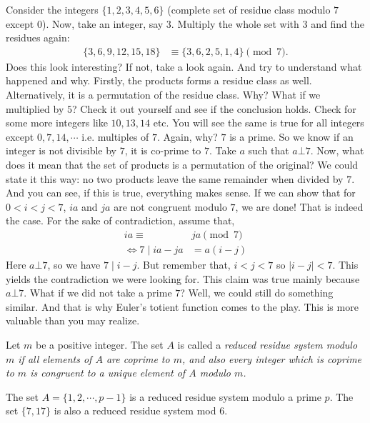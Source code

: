 \documentclass{subfile}
\begin{document}
	Consider the integers $\{1,2,3,4,5,6\}$ (complete set of residue class modulo $7$ except $0$). Now, take an integer, say $3$. Multiply the whole set with $3$ and find the residues again:
		\begin{align*}
			\{3,6,9,12,15,18\} & \equiv\{3,6,2,5,1,4\}\pmod7.
		\end{align*}
	Does this look interesting? If not, take a look again. And try to understand what happened and why. Firstly, the products forms a residue class as well. Alternatively, it is a permutation of the residue class. Why? What if we multiplied by $5$? Check it out yourself and see if the conclusion holds. Check for some more integers like $10, 13,14$ etc. You will see the same is true for all integers except $0,7,14,\cdots$ i.e. multiples of $7$. Again, why? $7$ is a prime. So we know if an integer is not divisible by $7$, it is co-prime to $7$. Take $a$ such that $a\bot7$. Now, what does it mean that the set of products is a permutation of the original? We could state it this way: no two products leave the same remainder when divided by $7$. And you can see, if this is true, everything makes sense. If we can show that for $0<i<j<7$, $ia$ and $ja$ are not congruent modulo $7$, we are done! That is indeed the case. For the sake of contradiction, assume that,
		\begin{align*}
			ia  \equiv &ja\pmod7\\
			\iff 7\mid ia-ja&=a(i-j)
		\end{align*}
	Here $a\bot7$, so we have $7\mid i-j$. But remember that, $i<j<7$ so $|i-j|<7$. This yields the contradiction we were looking for. This claim was true mainly because $a\bot7$. What if we did not take a prime $7$? Well, we could still do something similar. And that is why Euler's totient function comes to the play. This is more valuable than you may realize.
	
	\begin{definition}
		Let $m$ be a positive integer. The set $A$ is called a \slshape{reduced residue system modulo $m$} if all elements of $A$ are coprime to $m$, and also every integer which is coprime to $m$ is congruent to a unique element of $A$ modulo $m$.
	\end{definition}
	
	\begin{example}
		The set $A=\{ 1, 2, \cdots, p-1 \}$ is a reduced residue system modulo a prime $p$. The set $\{7, 17\}$ is also a reduced residue system mod $6$.
	\end{example}
	
\end{document}
